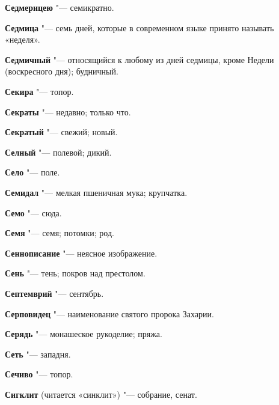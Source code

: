 \begin{mymulticols}{2}
\noindent\textbf{Седмерицею} "--- семикратно. 




\noindent\textbf{Седмица} "--- семь дней, которые в современном языке принято называть «неделя». 




\noindent\textbf{Седмичный} "--- относящийся к любому из дней седмицы, кроме Недели (воскресного дня); будничный. 




\noindent\textbf{Секира} "--- топор. 




\noindent\textbf{Секраты} "--- недавно; только что. 




\noindent\textbf{Секратый} "--- свежий; новый. 




\noindent\textbf{Селный} "--- полевой; дикий. 




\noindent\textbf{Село} "--- поле. 




\noindent\textbf{Семидал} "--- мелкая пшеничная мука; крупчатка. 




\noindent\textbf{Семо} "--- сюда. 




\noindent\textbf{Семя} "--- семя; потомки; род. 




\noindent\textbf{Сеннописание} "--- неясное изображение. 




\noindent\textbf{Сень} "--- тень; покров над престолом. 




\noindent\textbf{Септемврий} "--- сентябрь. 




\noindent\textbf{Серповидец} "--- наименование святого пророка Захарии. 




\noindent\textbf{Серядь} "--- монашеское рукоделие; пряжа. 




\noindent\textbf{Сеть} "--- западня. 




\noindent\textbf{Сечиво} "--- топор. 




\noindent\textbf{Сигклит} (читается «синклит») "--- собрание, сенат. 





\end{mymulticols}

